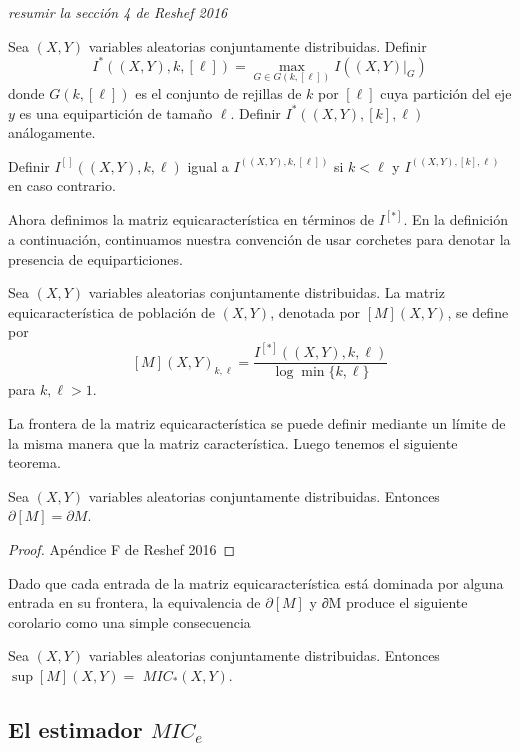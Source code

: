 	
	{\textit{resumir la secci\'on 4 de Reshef 2016}}

	\begin{defn}
		Sea $(X, Y)$ variables aleatorias conjuntamente distribuidas. Definir
		$$
		I^*((X, Y), k,[\ell])=\max _{G \in G(k,[\ell])} I\left(\left.(X, Y)\right|_G\right)
		$$
		donde $G(k,[\ell])$ es el conjunto de rejillas de $k$ por $[\ell]$ cuya partici\'on del eje $y$ es una equipartici\'on de tama\~no $\ell$. Definir $I^*((X, Y),[k], \ell)$ an\'alogamente.

		Definir $I^{[]}((X, Y), k, \ell)$ igual a $I^((X, Y), k,[\ell])$ si $k<\ell$ y $I^((X, Y),[k], \ell)$ en caso contrario.
	\end{defn}

	Ahora definimos la matriz equicaracter\'istica en t\'erminos de $I^{[*]}$. En la definici\'on a continuaci\'on, continuamos nuestra convenci\'on de usar corchetes para denotar la presencia de equiparticiones.

	\begin{defn}
		Sea $(X, Y)$ variables aleatorias conjuntamente distribuidas. La matriz equicaracter\'istica de poblaci\'on de $(X, Y)$, denotada por $[M](X, Y)$, se define por
		$$
		[M](X, Y)_{k, \ell}=\frac{I^{[*]}((X, Y), k, \ell)}{\log \min \{k, \ell\}}
		$$
		para $k, \ell>1$.
	\end{defn}

	La frontera de la matriz equicaracter\'istica se puede definir mediante un l\'imite de la misma manera que la matriz caracter\'istica. Luego tenemos el siguiente teorema.

	\begin{thm}
		Sea $(X, Y)$ variables aleatorias conjuntamente distribuidas. Entonces $\partial[M]=\partial M$.
	\end{thm}
	\begin{proof}
		Ap\'endice F de Reshef 2016
	\end{proof}

	Dado que cada entrada de la matriz equicaracter\'istica est\'a dominada por alguna entrada en su frontera, la equivalencia de $\partial [M]$ y ∂M produce el siguiente corolario como una simple consecuencia

	\begin{cor}
		Sea $(X, Y)$ variables aleatorias conjuntamente distribuidas. Entonces $\sup [M](X, Y)=$ $M I C_*(X, Y)$.
	\end{cor}

	\subsection[short]{El estimador $MIC_e$}

